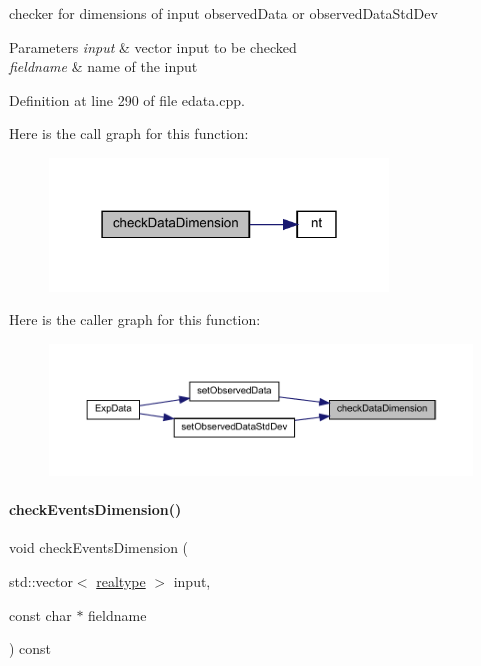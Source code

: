 checker for dimensions of input observed\+Data or observed\+Data\+Std\+Dev


\begin{DoxyParams}{Parameters}
{\em input} & vector input to be checked \\
\hline
{\em fieldname} & name of the input \\
\hline
\end{DoxyParams}


Definition at line 290 of file edata.\+cpp.

Here is the call graph for this function\+:
\nopagebreak
\begin{figure}[H]
\begin{center}
\leavevmode
\includegraphics[width=255pt]{classamici_1_1_exp_data_acad115e928a8b0bc8e90ebf9553d3eed_cgraph}
\end{center}
\end{figure}
Here is the caller graph for this function\+:
\nopagebreak
\begin{figure}[H]
\begin{center}
\leavevmode
\includegraphics[width=350pt]{classamici_1_1_exp_data_acad115e928a8b0bc8e90ebf9553d3eed_icgraph}
\end{center}
\end{figure}
\mbox{\label{classamici_1_1_exp_data_adcf5587f972fdef595fff78123f5118a}} 
\paragraph{\texorpdfstring{checkEventsDimension()}{checkEventsDimension()}}
{\footnotesize\ttfamily void check\+Events\+Dimension (\begin{DoxyParamCaption}\item[{std\+::vector$<$ \mbox{\hyperlink{namespaceamici_a1bdce28051d6a53868f7ccbf5f2c14a3}{realtype}} $>$}]{input,  }\item[{const char $\ast$}]{fieldname }\end{DoxyParamCaption}) const\hspace{0.3cm}{\ttfamily [protected]}}

